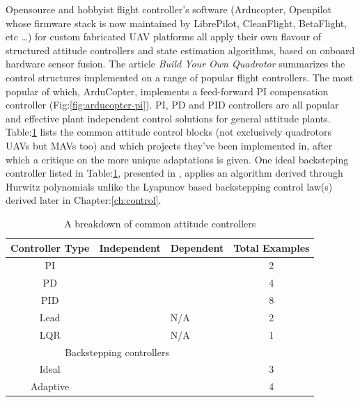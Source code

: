 Opensource and hobbyist flight controller's software (Arducopter\cite{arducoptersite}, Openpilot\cite{openpilotsite} whose firmware stack is now maintained by LibrePilot, CleanFlight\cite{cleanflight}, BetaFlight\cite{betaflight}, etc \ldots) for custom fabricated UAV platforms all apply their own flavour of structured attitude controllers and state estimation algorithms, based on onboard hardware sensor fusion. The article \emph{Build Your Own Quadrotor}\cite{buildyourownquad} summarizes the control structures implemented on a range of popular flight controllers. The most popular of which, ArduCopter, implements a feed-forward PI compensation controller (Fig:\ref{fig:arducopter-pi}).  PI, PD and PID controllers are all popular and effective plant independent control solutions for general attitude plants. Table:\ref{tab:controllers} lists the common attitude control blocks (not exclusively quadrotors UAVs but MAVs too) and which projects they've been implemented in, after which a critique on the more unique adaptations is given. One ideal backsteping controller listed in Table:\ref{tab:controllers}, presented in \cite{tpheonix}, applies an algorithm derived through Hurwitz polynomials unlike the Lyapunov based backstepping control law(s) derived later in Chapter:\ref{ch:control}.
\begin{table}[h]
\centering
\begin{tabular}{ |c|l|l|c| }
\hline
Controller Type & Independent & Dependent & Total Examples\\ \hline
PI & \cite{attitudecontrolproblem} & \cite{attitudecontrolproblem} & 2\\ \hline
PD & \cite{modelingquadcopter, tiltrihani} & \cite{fullquaternion,singleaxistilting} & 4\\ \hline
PID & \cite{optimizedpidquadcopter, attitudecontrolproblem, quaddynamics, tiltpropellercontrol, pidlqr} & \cite{attitudecontrolproblem, starmac, adaptivedisturbancecontrol} & 8\\ \hline
Lead & \cite{x4flyer, dynamicmodelling2009} & N/A & 2\\ \hline
LQR & \cite{pidlqr} & N/A & 1\\ 
\hline
\multicolumn{3}{|c|}{Backstepping controllers} & \\
\hline
Ideal & \cite{tpheonix, backsteppingquadcoptercontrol} & \cite{backsteppingquadcoptercontrol} & 3\\ \hline
Adaptive & \multicolumn{2}{l|}{\cite{adaptivebackstep, nonlinearadaptive, 6dofbackstep, intelligentbackstep}} & 4\\ \hline
\end{tabular}
\caption{A breakdown of common attitude controllers}
\label{tab:controllers}
\end{table}

